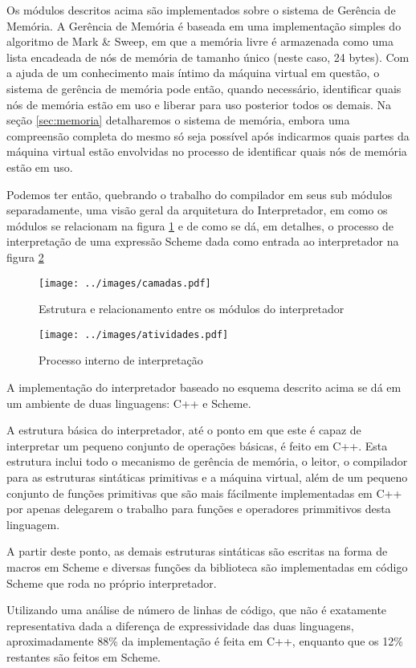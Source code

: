 Os módulos descritos acima são implementados sobre o sistema de Gerência de
Memória. A Gerência de Memória é baseada em uma implementação simples do
algoritmo de Mark \& Sweep\cite{jones:gc}, em que a memória livre é armazenada como uma
lista encadeada de nós de memória de tamanho único (neste caso, 24 bytes). Com
a ajuda de um conhecimento mais íntimo da máquina virtual em questão, o sistema
de gerência de memória pode então, quando necessário, identificar quais nós de
memória estão em uso e liberar para uso posterior todos os demais. Na seção
\ref{sec:memoria} detalharemos o sistema de memória, embora uma compreensão
completa do mesmo só seja possível após indicarmos quais partes da máquina
virtual estão envolvidas no processo de identificar quais nós de memória estão
em uso.

Podemos ter então, quebrando o trabalho do compilador em seus sub módulos
separadamente, uma visão geral da arquitetura do Interpretador, em como os
módulos se relacionam na figura \ref{fig:camadas} e de como se dá, em detalhes, o
processo de interpretação de uma expressão Scheme dada como entrada ao
interpretador na figura \ref{fig:atividades}

\begin{figure}[h!]
\centering
\texttt{[image: ../images/camadas.pdf]}
\caption{Estrutura e relacionamento entre os módulos do interpretador}
\label{fig:camadas}
\end{figure}

\begin{figure}[h!]
\centering
\texttt{[image: ../images/atividades.pdf]}
\caption{Processo interno de interpretação}
\label{fig:atividades}
\end{figure}

A implementação do interpretador baseado no esquema descrito acima se dá em um
ambiente de duas linguagens: C++ e Scheme.

A estrutura básica do interpretador, até o ponto em que este é capaz de
interpretar um pequeno conjunto de operações básicas, é feito em C++. Esta
estrutura inclui todo o mecanismo de gerência de memória, o leitor, o
compilador para as estruturas sintáticas primitivas e a máquina virtual, além
de um pequeno conjunto de funções primitivas que são mais fácilmente
implementadas em C++ por apenas delegarem o trabalho para funções e operadores
primmitivos desta linguagem.

A partir deste ponto, as demais estruturas sintáticas são escritas na forma de
macros em Scheme e diversas funções da biblioteca são implementadas em código
Scheme que roda no próprio interpretador. 

Utilizando uma análise de número de linhas de código, que não é exatamente
representativa dada a diferença de expressividade das duas linguagens,
aproximadamente 88\% da implementação é feita em C++, enquanto que os 12\%
restantes são feitos em Scheme.



